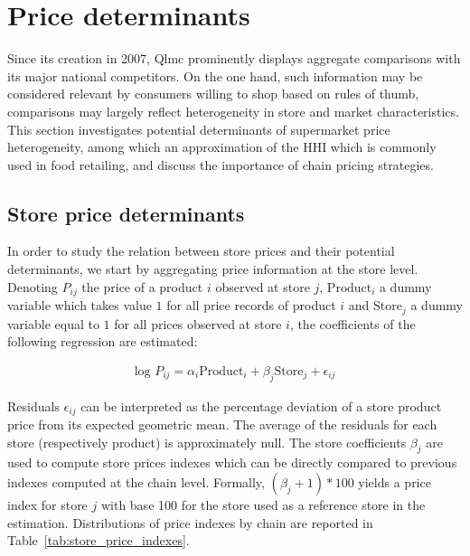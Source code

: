 \documentclass[english]{article}
\begin{document}
\section{Price determinants}

Since its creation in 2007, Qlmc prominently displays aggregate comparisons with its major national competitors. On the one hand, such information may be considered relevant by consumers willing to shop based on rules of thumb, comparisons may largely reflect heterogeneity in store and market characteristics. This section investigates potential determinants of supermarket price heterogeneity, among which an approximation of the HHI which is commonly used in food retailing, and discuss the importance of chain pricing strategies. 

\subsection{Store price determinants}

In order to study the relation between store prices and their potential determinants, we start by aggregating price information at the store level. Denoting $P_{ij}$ the price of a product $i$ observed at store $j$, $\text{Product}_i$ a dummy variable which takes value $1$ for all price records of product $i$ and $\text{Store}_j$ a dummy variable equal to $1$ for all prices observed at store $i$, the coefficients of the following regression are estimated:

\begin{align}
\text{log }P_{ij} = \alpha_i \text{Product}_i + \beta_j \text{Store}_j + \epsilon_{ij}
\label{reg_product_prices}
\end{align}

Residuals $\epsilon_{ij}$ can be interpreted as the percentage deviation of a store product price from its expected geometric mean. The average of the residuals for each store (respectively product) is approximately null. The store coefficients $\beta_j$ are used to compute store prices indexes which can be directly compared to previous indexes computed at the chain level. Formally, $(\beta_j + 1) * 100$ yields a price index for store $j$ with base 100 for the store used as a reference store in the estimation. Distributions of price indexes by chain are reported in Table~\ref{tab:store_price_indexes}.
\end{document}
